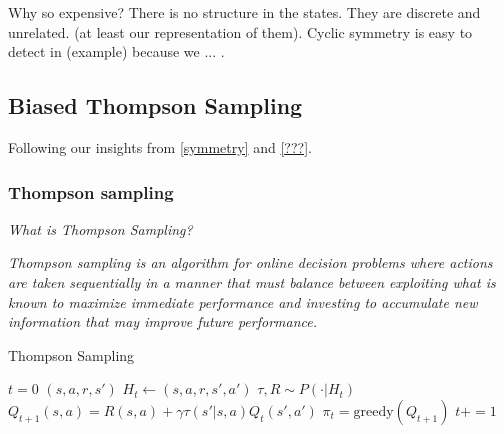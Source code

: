 Why so expensive? There is no structure in the states. They are discrete and unrelated.
(at least our representation of them). Cyclic symmetry is easy to detect in (example) because
we ... .


\subsection{Biased Thompson Sampling} \label{thompson-sampling}

Following our insights from \ref{symmetry} and \ref{???}.




\subsubsection{Thompson sampling}
\begin{displayquote}
	\textsl{What is Thompson Sampling?}
\end{displayquote}

\begin{displayquote}
	\textit{Thompson sampling is an algorithm for online decision problems where actions are taken sequentially in a manner that
must balance between exploiting what is known to maximize immediate performance and investing to accumulate
new information that may improve future performance.}\cite{Russo2017}
\end{displayquote}


\begin{algorithm}
	\caption{Thompson Sampling}
	\begin{algorithmic}[1]

		\State $t=0$
		\State $(s, a, r, s')$ 
		\State $H_t \leftarrow (s, a, r, s', a')$ 
		\State $\tau, R \sim P(\cdot | H_t)$ 
		\State $Q_{t+1}(s, a) = R(s, a) + \gamma \tau(s'| s, a) Q_t(s', a')$ 
		\State $\pi_t = \text{greedy}(Q_{t+1})$ 
		\State $t += 1$

		\EndWhile
		\State {}
		\EndProcedure

	\end{algorithmic}
\end{algorithm}

